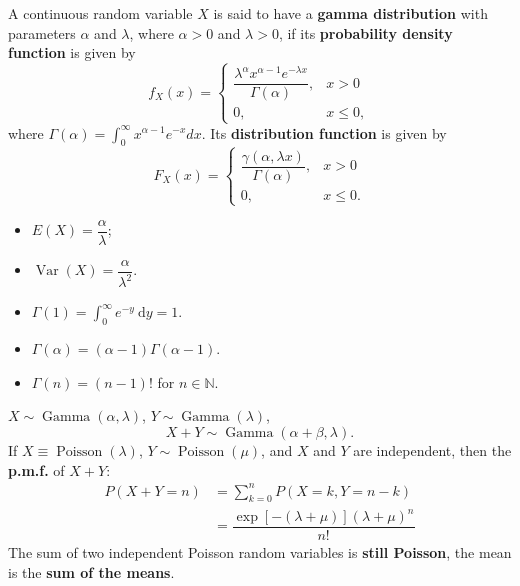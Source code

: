  A continuous random variable \(X\) is said to have a
\textbf{gamma distribution} with parameters \(\alpha\) and \(\lambda\), where
\(\alpha > 0\) and \(\lambda > 0\), if its \textbf{probability density function}
is given by
\[f_X(x) = \begin{cases}
  \dfrac{\lambda^{\alpha}x^{\alpha-1}e^{-\lambda x}}{\Gamma(\alpha)}, & x > 0 \\
  0, & x \leq 0,
\end{cases}\]
where \(\Gamma(\alpha) = \int_0^{\infty} x^{\alpha-1}e^{-x}dx\).
Its \textbf{distribution function} is given by
\[F_X(x) = \begin{cases}
  \dfrac{\gamma(\alpha, \lambda x)}{\Gamma(\alpha)}, & x > 0 \\
  0, & x \leq 0.
\end{cases}\]
\begin{multicols}{2}
  \begin{itemize}
    \item \(E(X) = \dfrac{\alpha}{\lambda}\);
    \item \(\operatorname{Var}(X) = \dfrac{\alpha}{\lambda^2}\).
    \item \(\Gamma(1) = \int_{0}^{\infty}e^{-y}\ \mathrm{d}y = 1.\)
    \item \(\Gamma(\alpha) = (\alpha - 1)\Gamma(\alpha - 1)\).
    \item \(\Gamma(n) = (n-1)!\) for \(n \in \mathbb{N}\).
  \end{itemize}
\end{multicols}

\(X\sim \operatorname{Gamma}\left(\alpha,\lambda\right)\), \(Y \sim
\operatorname{Gamma}\left(\lambda\right)\), \tf 
\[X + Y \sim \operatorname{Gamma}\left(\alpha+\beta, \lambda\right).\]
If \(X \equiv
\operatorname{Poisson}\left(\lambda\right)\), \(Y \sim
\operatorname{Poisson}\left(\mu\right)\), and \(X\) and \(Y\) are independent,
then the \textbf{p.m.f.} of \(X + Y\):
\begin{align*}
  P(X + Y = n) &= \sum\limits_{k=0}^{n}P(X = k, Y = n-k) \\ 
               &= \dfrac{\exp[-(\lambda + \mu)](\lambda + \mu)^n}{n!}
\end{align*}
The sum of two independent Poisson random variables is \textbf{still Poisson}, 
the mean is the \textbf{sum of the means}.

